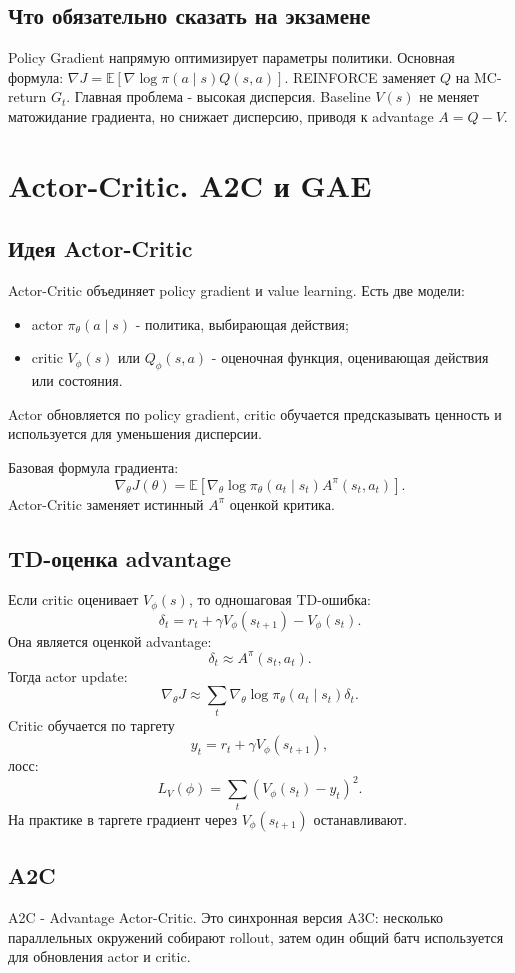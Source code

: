 \documentclass[11pt,a4paper]{article}
\newcommand{\E}{\mathbb{E}}
\newcommand{\1}{\mathbf{1}}
\begin{document}
\subsection*{Что обязательно сказать на экзамене}
Policy Gradient напрямую оптимизирует параметры политики. Основная формула: $\nabla J=\E[\nabla\log\pi(a\mid s)Q(s,a)]$. REINFORCE заменяет $Q$ на MC-return $G_t$. Главная проблема - высокая дисперсия. Baseline $V(s)$ не меняет матожидание градиента, но снижает дисперсию, приводя к advantage $A=Q-V$.

\newpage
\section{Actor-Critic. A2C и GAE}

\subsection*{Идея Actor-Critic}
Actor-Critic объединяет policy gradient и value learning. Есть две модели:
\begin{itemize}
    \item actor $\pi_\theta(a\mid s)$ - политика, выбирающая действия;
    \item critic $V_\phi(s)$ или $Q_\phi(s,a)$ - оценочная функция, оценивающая действия или состояния.
\end{itemize}
Actor обновляется по policy gradient, critic обучается предсказывать ценность и используется для уменьшения дисперсии.

Базовая формула градиента:
\[
    \nabla_\theta J(\theta)=\E\left[\nabla_\theta\log\pi_\theta(a_t\mid s_t)A^\pi(s_t,a_t)\right].
\]
Actor-Critic заменяет истинный $A^\pi$ оценкой критика.

\subsection*{TD-оценка advantage}
Если critic оценивает $V_\phi(s)$, то одношаговая TD-ошибка:
\[
    \delta_t=r_t+\gamma V_\phi(s_{t+1})-V_\phi(s_t).
\]
Она является оценкой advantage:
\[
    \delta_t\approx A^\pi(s_t,a_t).
\]
Тогда actor update:
\[
    \nabla_\theta J\approx \sum_t \nabla_\theta\log\pi_\theta(a_t\mid s_t)\delta_t.
\]
Critic обучается по таргету
\[
    y_t=r_t+\gamma V_\phi(s_{t+1}),
\]
лосс:
\[
    L_V(\phi)=\sum_t\left(V_\phi(s_t)-y_t\right)^2.
\]
На практике в таргете градиент через $V_\phi(s_{t+1})$ останавливают.

\subsection*{A2C}
A2C - Advantage Actor-Critic. Это синхронная версия A3C: несколько параллельных окружений собирают rollout, затем один общий батч используется для обновления actor и critic.
\end{document}
